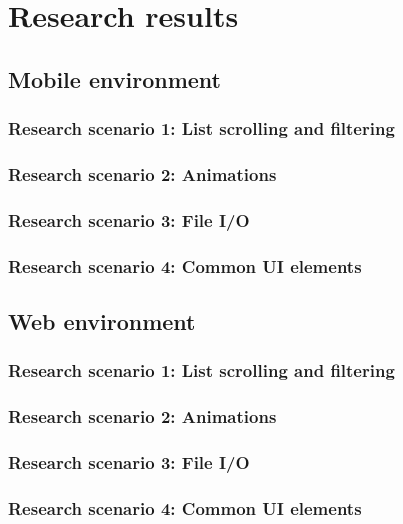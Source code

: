 
\chapter{Research results}

\section{Mobile environment}

\subsection{Research scenario 1: List scrolling and filtering}

\subsection{Research scenario 2: Animations}

\subsection{Research scenario 3: File I/O}

\subsection{Research scenario 4: Common UI elements}

\section{Web environment}

\subsection{Research scenario 1: List scrolling and filtering}

\subsection{Research scenario 2: Animations}

\subsection{Research scenario 3: File I/O}

\subsection{Research scenario 4: Common UI elements}
